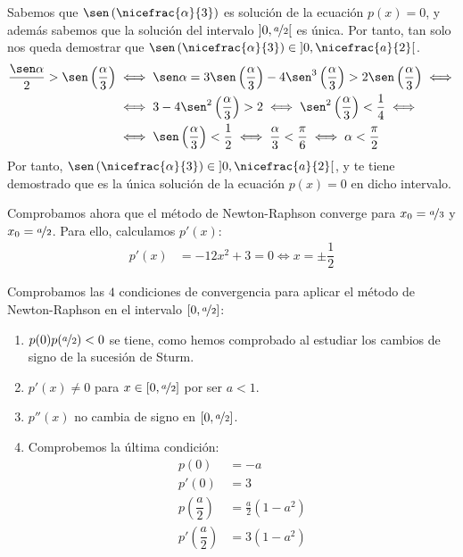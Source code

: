 \begin{ejercicio}
\begin{enumerate}
        Sabemos que $\sen\left(\nicefrac{\alpha}{3}\right)$ es solución de la ecuación $p(x) = 0$, y además sabemos que la solución del intervalo $\left]0,\nicefrac{a}{2}\right[$ es única. Por tanto, tan solo nos queda demostrar que $\sen\left(\nicefrac{\alpha}{3}\right)\in \left]0,\nicefrac{a}{2}\right[$.
        \begin{align*}
            \dfrac{\sen \alpha}{2}>\sen\left(\dfrac{\alpha}{3}\right)&\iff
            \sen\alpha = 3\sen\left(\dfrac{\alpha}{3}\right)-4\sen^3\left(\dfrac{\alpha}{3}\right)>2\sen\left(\dfrac{\alpha}{3}\right)\iff \\ &\iff
            3-4\sen^2\left(\dfrac{\alpha}{3}\right)>2\iff 
            \sen^2\left(\dfrac{\alpha}{3}\right)<\frac{1}{4}
            \iff \\ &\iff \sen\left(\dfrac{\alpha}{3}\right)<\frac{1}{2}
            \iff \frac{\alpha}{3}<\frac{\pi}{6}\iff \alpha<\frac{\pi}{2}
        \end{align*}
        Por tanto, $\sen\left(\nicefrac{\alpha}{3}\right)\in \left]0,\nicefrac{a}{2}\right[$, y te tiene demostrado que es la única solución de la ecuación $p(x) = 0$ en dicho intervalo.

        Comprobamos ahora que el método de Newton-Raphson converge para $x_0 = \nicefrac{a}{3}$ y $x_0 = \nicefrac{a}{2}$. Para ello, calculamos $p'(x)$:
        \begin{align*}
            p'(x) &= -12x^2 + 3=0\iff x=\pm \dfrac{1}{2}
        \end{align*}

        Comprobamos las $4$ condiciones de convergencia para aplicar el método de Newton-Raphson en el intervalo $\left[0,\nicefrac{a}{2}\right]$:
        \begin{enumerate}
            \item $p(0)p(\nicefrac{a}{2})<0$ se tiene, como hemos comprobado al estudiar los cambios de signo de la sucesión de Sturm.

            \item $p'(x)\neq 0$ para $x\in \left[0,\nicefrac{a}{2}\right]$ por ser $a<1$. 
            \item $p''(x)$ no cambia de signo en $\left[0,\nicefrac{a}{2}\right]$.
            \item Comprobemos la última condición:
            \begin{align*}
                p(0) &= -a\\
                p'(0) &= 3\\
                p\left(\dfrac{a}{2}\right) &= \frac{a}{2}(1-a^2)\\
                p'\left(\dfrac{a}{2}\right) &= 3(1-a^2)
            \end{align*}


\end{enumerate}
\end{enumerate}
\end{ejercicio}
